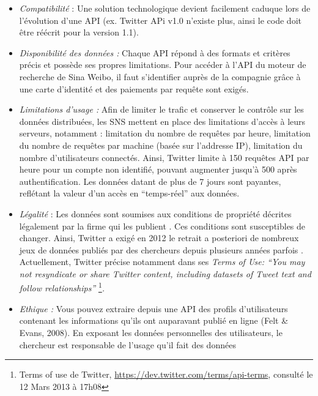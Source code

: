 \begin{itemize}
\item \textit{Compatibilit\'e }: Une solution technologique devient
facilement caduque lors de l{\textquoteright}\'evolution
d{\textquoteright}une API (ex. Twitter APi v1.0
n{\textquoteright}existe plus, ainsi le code doit \^etre r\'e\'ecrit
pour la version 1.1). 
\item \textit{Disponibilit\'e des donn\'ees :} Chaque API r\'epond \`a
des formats et crit\`eres pr\'ecis et poss\`ede ses propres
limitations. Pour acc\'eder \`a l{\textquoteright}API du moteur de
recherche de Sina Weibo, il faut s{\textquoteright}identifier aupr\`es
de la compagnie gr\^ace \`a une carte d{\textquoteright}identit\'e et
des paiements par requ\^ete sont exig\'es. 
\item \textit{Limitations d{\textquoteright}usage : }Afin de limiter le
trafic et conserver le contr\^ole sur les donn\'ees distribu\'ees, les
SNS mettent en place des limitations d{\textquoteright}acc\`es \`a
leurs serveurs, notamment : limitation du nombre de requ\^etes par
heure, limitation du nombre de requ\^etes par machine (bas\'ee sur
l{\textquoteright}addresse IP), limitation du nombre
d{\textquoteright}utilisateurs connect\'es. Ainsi, Twitter limite \`a
150 requ\^etes API par heure pour un compte non identifi\'e, pouvant
augmenter jusqu{\textquoteright}\`a 500 apr\`es authentification. Les
donn\'ees datant de plus de 7 jours sont payantes, refl\'etant la
valeur d{\textquoteright}un acc\`es en
{\textquotedblleft}temps-r\'eel{\textquotedblright} aux donn\'ees.
\item \textit{L\'egalit\'e }: Les donn\'ees sont soumises aux conditions
de propri\'et\'e d\'ecrites l\'egalement par la firme qui les publient
\cite{Clifton2006}. Ces conditions sont susceptibles de changer. Ainsi,
Twitter a exig\'e en 2012 le retrait a posteriori de nombreux jeux de
donn\'ees publi\'es par des chercheurs depuis plusieurs ann\'ees
parfois \cite{McCreadie2012}. Actuellement, Twitter pr\'ecise notamment
dans ses \textit{Terms of Use: {\textquotedblleft}You may not
resyndicate or share Twitter content, including datasets of Tweet text
and follow relationships{\textquotedblright} }\footnote{ Terms of use
de Twitter, \url{https://dev.twitter.com/terms/api-terms}, consult\'e
le 12 Mars 2013 \`a 17h08}\textit{. ~}
\item \textit{Ethique : }Vous pouvez extraire depuis une API des profils
d{\textquoteright}utilisateurs contenant les informations
qu{\textquoteright}ils ont auparavant publi\'e en ligne (Felt \& Evans,
2008). En exposant les donn\'ees personnelles des utilisateurs, le
chercheur est responsable de l{\textquoteright}usage
qu{\textquoteright}il fait des donn\'ees \cite{Rieder2005} 
\end{itemize}
